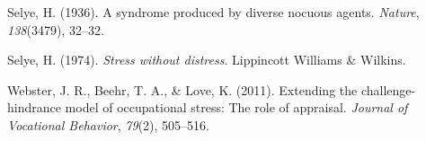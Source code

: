 \documentclass[
  man]{apa6}
\newlength{\cslhangindent}
\newlength{\cslentryspacingunit} %
\newenvironment{CSLReferences}[2] %
 {%
  \setlength{\parindent}{0pt}
  \ifodd #1
  \let\oldpar\par
  \def\par{\hangindent=\cslhangindent\oldpar}
  \fi
  \setlength{\parskip}{#2\cslentryspacingunit}
 }%
 {}
\begin{document}
\begin{CSLReferences}{1}{0}
\leavevmode{}%
Selye, H. (1936). A syndrome produced by diverse nocuous agents. \emph{Nature}, \emph{138}(3479), 32--32.

\leavevmode{}%
Selye, H. (1974). \emph{Stress without distress}. Lippincott Williams \& Wilkins.

\leavevmode{}%
Webster, J. R., Beehr, T. A., \& Love, K. (2011). Extending the challenge-hindrance model of occupational stress: The role of appraisal. \emph{Journal of Vocational Behavior}, \emph{79}(2), 505--516.

\end{CSLReferences}
\end{document}
